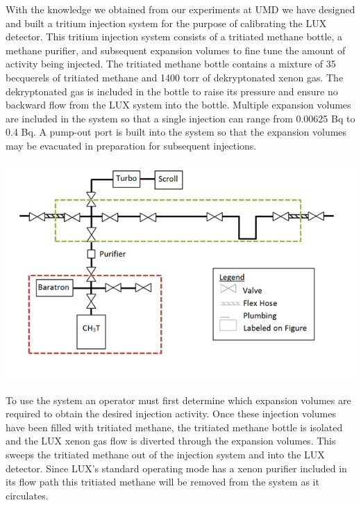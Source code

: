 \documentclass[a4paper,12pt]{article}
\begin{document}
With the knowledge we obtained from our experiments at UMD we have designed and built a tritium injection system for the purpose of calibrating the LUX detector.  This tritium injection system consists of a tritiated methane bottle, a methane purifier, and subsequent expansion volumes to fine tune the amount of activity being injected.  The tritiated methane bottle contains a mixture of 35 becquerels of tritiated methane and 1400 torr of dekryptonated xenon gas.  The dekryptonated gas is included in the bottle to raise its pressure and ensure no backward flow from the LUX system into the bottle.  Multiple expansion volumes are included in the system so that a single injection can range from 0.00625 Bq to 0.4 Bq.  A pump-out port is built into the system so that the expansion volumes may be evacuated in preparation for subsequent injections.

\begin{center}
\includegraphics[scale=0.7]{Injection_Plumbing_Colored.png}
\end{center}

To use the system an operator must first determine which expansion volumes are required to obtain the desired injection activity.  Once these injection volumes have been filled with tritiated methane, the tritiated methane bottle is isolated and the LUX xenon gas flow is diverted through the expansion volumes.  This sweeps the tritiated methane out of the injection system and into the LUX detector.  Since LUX's standard operating mode has a xenon purifier included in its flow path this tritiated methane will be removed from the system as it circulates. 
\end{document}
